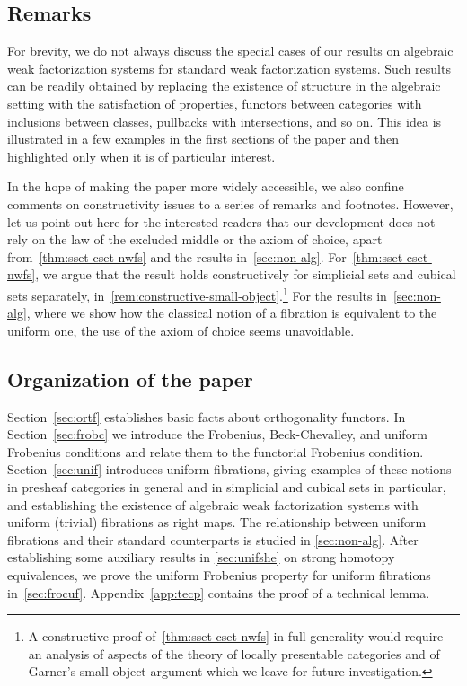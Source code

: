 \documentclass[reqno,10pt,a4paper,oneside,draft]{amsart}
\begin{document}
\subsection*{Remarks} For brevity, we do not always discuss the special cases  of our results on algebraic
weak factorization systems  for standard weak factorization systems.
Such results can be readily obtained  by replacing 
the existence of structure in the algebraic setting with the satisfaction of properties,
functors between categories with inclusions between
classes, pullbacks with intersections, and so on. This idea is illustrated in 
a few examples in the first sections of the paper and then highlighted only 
when it is of particular interest.

In the hope of making the paper more widely accessible, we also
confine comments on constructivity issues to a series of remarks and footnotes.
However,
let us point out here for the interested readers  that
 our development does not rely on the law of the excluded middle or the axiom of choice, apart  from~\cref{thm:sset-cset-nwfs} and the results in~\cref{sec:non-alg}. For~\cref{thm:sset-cset-nwfs}, we argue that the result holds constructively for simplicial sets and
cubical sets separately, in~\cref{rem:constructive-small-object}.\footnote{A constructive proof 
of~\cref{thm:sset-cset-nwfs} in full generality would require an analysis of aspects
of the theory of locally presentable categories and of Garner's small object argument 
which we leave for future investigation.} For the results in~\cref{sec:non-alg}, where we show how the classical notion of a fibration is equivalent to the uniform one, the use of the axiom of choice seems unavoidable.


\subsection*{Organization of the paper}
Section~\ref{sec:ortf} establishes basic facts about orthogonality functors.  In Section~\ref{sec:frobc}
we introduce the Frobenius, Beck-Chevalley, and uniform Frobenius conditions and relate them
to the functorial Frobenius condition. Section~\ref{sec:unif} introduces uniform fibrations, giving examples of these notions in presheaf categories in general and in simplicial and cubical sets in particular,
and establishing the existence of algebraic weak factorization systems with uniform (trivial) fibrations as right maps.
The relationship between uniform fibrations and their standard counterparts
 is studied in \cref{sec:non-alg}.
After establishing some auxiliary results in \cref{sec:unifshe} on strong homotopy equivalences, we prove the uniform Frobenius property for 
uniform fibrations in~\cref{sec:frocuf}.
Appendix~\ref{app:tecp} contains the proof of a technical lemma.
\end{document}
